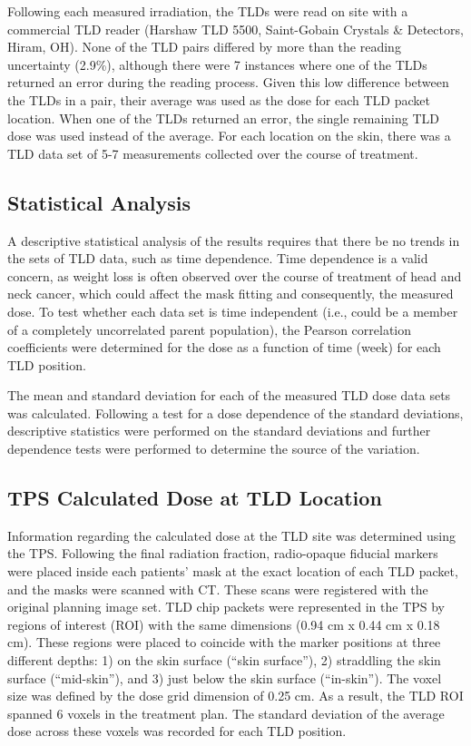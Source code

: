 Following each measured irradiation, the TLDs were read on site with a commercial TLD reader (Harshaw TLD 5500, Saint-Gobain Crystals \& Detectors, Hiram, OH). None of the TLD pairs differed by more than the reading uncertainty (2.9\%), although there were 7 instances where one of the TLDs returned an error during the reading process. Given this low difference between the TLDs in a pair, their average was used as the dose for each TLD packet location. When one of the TLDs returned an error, the single remaining TLD dose was used instead of the average. For each location on the skin, there was a TLD data set of 5-7 measurements collected over the course of treatment.

\subsection{Statistical Analysis}
A descriptive statistical analysis of the results requires that there be no trends in the sets of TLD data, such as time dependence. Time dependence is a valid concern, as weight loss is often observed over the course of treatment of head and neck cancer, which could affect the mask fitting and consequently, the measured dose. To test whether each data set is time independent (i.e., could be a member of a completely uncorrelated parent population), the Pearson correlation coefficients were determined for the dose as a function of time (week) for each TLD position.\cite{Bevington2003}

The mean and standard deviation for each of the measured TLD dose data sets was calculated. Following a test for a dose dependence of the standard deviations, descriptive statistics were performed on the standard deviations and further dependence tests were performed to determine the source of the variation.

\subsection{TPS Calculated Dose at TLD Location}
Information regarding the calculated dose at the TLD site was determined using the TPS. Following the final radiation fraction, radio-opaque fiducial markers were placed inside each patients’ mask at the exact location of each TLD packet, and the masks were scanned with CT. These scans were registered with the original planning image set. TLD chip packets were represented in the TPS by regions of interest (ROI) with the same dimensions (0.94 cm x 0.44 cm x 0.18 cm). These regions were placed to coincide with the marker positions at three different depths: 1) on the skin surface (“skin surface”), 2) straddling the skin surface (“mid-skin”), and 3) just below the skin surface (“in-skin”). The voxel size was defined by the dose grid dimension of 0.25 cm. As a result, the TLD ROI spanned 6 voxels in the treatment plan. The standard deviation of the average dose across these voxels was recorded for each TLD position.

